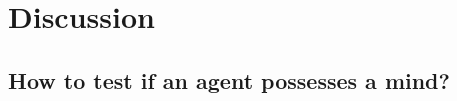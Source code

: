 \documentclass[11pt]{article}
\newenvironment{draft}{\color{dark-cornflower-blue-2}}{\ignorespacesafterend}
\begin{document}


\section{Discussion}
\label{sec:discussion}

\subsection{How to test if an agent possesses a mind?}
\end{document}
